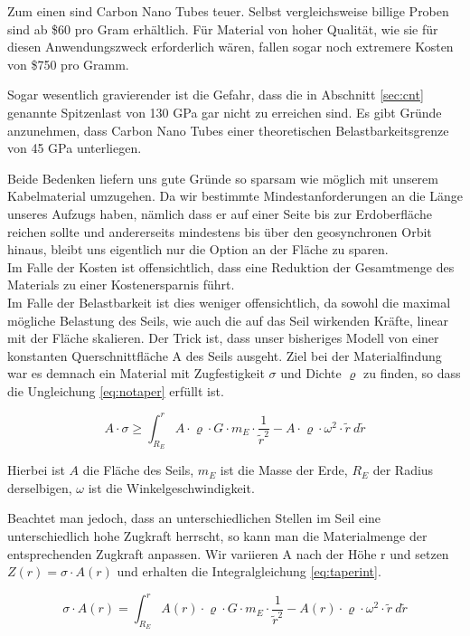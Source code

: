 \documentclass[a4paper, 10pt]{report}
\begin{document}
Zum einen sind Carbon Nano Tubes teuer. Selbst vergleichsweise billige Proben sind ab \$60 pro Gram erhältlich. Für Material von hoher Qualität, wie sie für diesen Anwendungszweck erforderlich wären, fallen sogar noch extremere Kosten von \$750 pro Gramm\cite{baughman2002carbon}.

Sogar wesentlich gravierender ist die Gefahr, dass die in Abschnitt \ref{sec:cnt} genannte Spitzenlast von 130 GPa gar nicht zu erreichen sind. Es gibt Gründe anzunehmen, dass Carbon Nano Tubes einer theoretischen Belastbarkeitsgrenze von 45 GPa unterliegen\cite{pugno2007space}.

Beide Bedenken liefern uns gute Gründe so sparsam wie möglich mit unserem Kabelmaterial umzugehen. Da wir bestimmte Mindestanforderungen an die Länge unseres Aufzugs haben, nämlich dass er auf einer Seite bis zur Erdoberfläche reichen sollte und andererseits mindestens bis über den geosynchronen Orbit hinaus, bleibt uns eigentlich nur die Option an der Fläche zu sparen.\\
Im Falle der Kosten ist offensichtlich, dass eine Reduktion der Gesamtmenge des Materials zu einer Kostenersparnis führt.\\
Im Falle der Belastbarkeit ist dies weniger offensichtlich, da sowohl die maximal mögliche Belastung des Seils, wie auch die auf das Seil wirkenden Kräfte, linear mit der Fläche skalieren. Der Trick ist, dass unser bisheriges Modell von einer konstanten Querschnittfläche A des Seils ausgeht. Ziel bei der Materialfindung war es demnach ein Material mit Zugfestigkeit $\sigma$ und Dichte $\varrho$ zu finden, so dass die Ungleichung \ref{eq:notaper} erfüllt ist.

\begin{equation}
A \cdot \sigma \geq \int_{R_E}^{r} A \cdot \varrho \cdot G \cdot m_E \cdot \frac{1}{\tilde{r}^2} - A \cdot \varrho \cdot \omega^2 \cdot \tilde{r}\ d\tilde{r}
\label{eq:notaper}
\end{equation}

Hierbei ist $A$ die Fläche des Seils, $m_E$ ist die Masse der Erde, $R_E$ der Radius derselbigen, $\omega$ ist die Winkelgeschwindigkeit.

Beachtet man jedoch, dass an unterschiedlichen Stellen im Seil eine unterschiedlich hohe Zugkraft herrscht, so kann man die Materialmenge der entsprechenden Zugkraft anpassen.
Wir variieren A nach der Höhe r und setzen $Z(r) = \sigma \cdot A(r)$ und erhalten die Integralgleichung \ref{eq:taperint}.

\begin{equation}
\sigma \cdot A(r) = \int_{R_E}^{r} A(r) \cdot \varrho \cdot G \cdot m_E \cdot \frac{1}{\tilde{r}^2} - A(r) \cdot \varrho \cdot \omega^2 \cdot \tilde{r}\ d\tilde{r}
\label{eq:taperint}
\end{equation}
\end{document}
